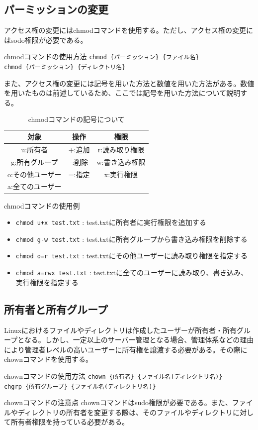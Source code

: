 \documentclass[a4paper, 11pt, dvipdfmx]{jsarticle}
\begin{document}
\subsection{パーミッションの変更}
アクセス権の変更にはchmodコマンドを使用する。ただし、アクセス権の変更にはsodo権限が必要である。\\
\begin{commandbox}{chmodコマンドの使用方法}
  \verb|chmod {パーミッション} {ファイル名}|\\
  \verb|chmod {パーミッション} {ディレクトリ名}|
\end{commandbox}
また、アクセス権の変更には記号を用いた方法と数値を用いた方法がある。数値を用いたものは前述しているため、ここでは記号を用いた方法について説明する。
\begin{table}[H]
  \centering
  \caption{chmodコマンドの記号について}
  \begin{tabular}{|c|c|c|} \hline
    対象 & 操作 & 権限 \\ \hline
    u:所有者 & +:追加 & r:読み取り権限 \\
    g:所有グループ & -:削除 & w:書き込み権限 \\
    o:その他ユーザー & =:指定 & x:実行権限 \\
    a:全てのユーザー & & \\ \hline
  \end{tabular}
\end{table}
\begin{hosokubox}{chmodコマンドの使用例}
  \begin{itemize}
    \item \verb|chmod u+x test.txt| : test.txtに所有者に実行権限を追加する
    \item \verb|chmod g-w test.txt| : test.txtに所有グループから書き込み権限を削除する
    \item \verb|chmod o=r test.txt| : test.txtにその他ユーザーに読み取り権限を指定する
    \item \verb|chmod a=rwx test.txt| : test.txtに全てのユーザーに読み取り、書き込み、実行権限を指定する
  \end{itemize}
\end{hosokubox}
\subsection{所有者と所有グループ}
Linuxにおけるファイルやディレクトリは作成したユーザーが所有者・所有グループとなる。しかし、一定以上のサーバー管理となる場合、管理体系などの理由により管理者レベルの高いユーザーに所有権を譲渡する必要がある。その際にchownコマンドを使用する。
\begin{commandbox}{chownコマンドの使用方法}
  \verb|chown {所有者} {ファイル名(ディレクトリ名)}|\\
  \verb|chgrp {所有グループ} {ファイル名(ディレクトリ名)}|
\end{commandbox}
\begin{attentionbox}{chownコマンドの注意点}
  chownコマンドはsudo権限が必要である。また、ファイルやディレクトリの所有者を変更する際は、そのファイルやディレクトリに対して所有者権限を持っている必要がある。
\end{attentionbox}
\end{document}
